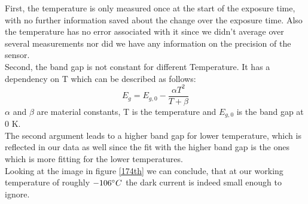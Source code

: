 First, the temperature is only measured once at the start of the exposure time, with no further information saved about the change over the exposure time. Also the temperature has no error associated with it since we didn't average over several measurements nor did we have any information on the precision of the sensor.\\
Second, the band gap is not constant for different Temperature. It has a dependency on T which can be described \cite{band_gap_dep} as follows:
\begin{equation}
	\label{band_gap_depen}
	E_g = E_{g,0} - \dfrac{\alpha T^2}{T + \beta}
\end{equation}
$\alpha$ and $\beta$ are material constants, T is the temperature and $E_{g,0}$ is the band gap at 0 K.\\ The second argument leads to a higher band gap for lower temperature, which is reflected in our data as well since the fit with the higher band gap is the ones which is more fitting for the lower temperatures.
\vspace{2mm}\\
Looking at the image in figure \ref{174th} we can conclude, that at our working temperature of roughly $-106 \degree C$ the dark current is indeed small enough to ignore. 
\vspace{4mm}
